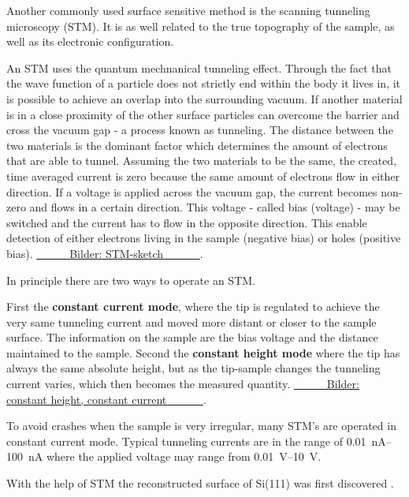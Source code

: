 Another commonly used surface sensitive method is the scanning tunneling microscopy (STM). It is as well related to the true topography of the sample, as well as its electronic configuration.

An  STM uses the quantum mechnanical tunneling effect. Through the fact that the wave function of a particle does not strictly end within the body it lives in, it is possible to achieve an overlap into the surrounding vacuum. If another material is in a close proximity of the other surface particles can overcome the barrier and cross the vacuum gap - a process known as tunneling. The distance between the two materials is the dominant factor which determines the amount of electrons that are able to tunnel. Assuming the two materials to be the same, the created, time averaged current is zero because the same amount of electrons flow in either direction. If a voltage is applied across the vacuum gap, the current becomes non-zero and flows in a certain direction. This voltage - called bias (voltage) - may be switched and the current has to flow in the opposite direction. This enable detection of either electrons living in the sample (negative bias) or holes (positive bias).
\underline{\ \ \ \ \ \ Bilder: STM-sketch \ \ \ \ \ \ }.

In principle there are two ways to operate an STM. 

First the \textbf{constant current mode}, where the tip is regulated to achieve the very same tunneling current and moved more distant or closer to the sample surface. The information on the sample are the bias voltage and the distance maintained to the sample. 
Second the \textbf{constant height mode} where the tip has always the same absolute height, but as the tip-sample changes the tunneling current varies, which then becomes the measured quantity.
\underline{\ \ \ \ \ \ Bilder: constant height, constant current \ \ \ \ \ \ }.

To avoid crashes when the sample is very irregular, many STM's are operated in constant current mode. Typical tunneling currents are in the range of \SIrange{0.01}{100}{\nA} where the applied voltage may range from \SIrange{0.01}{10}{\volt}.

With the help of STM the reconstructed surface of Si(111) was first discovered \cite{binnig_1983}.

